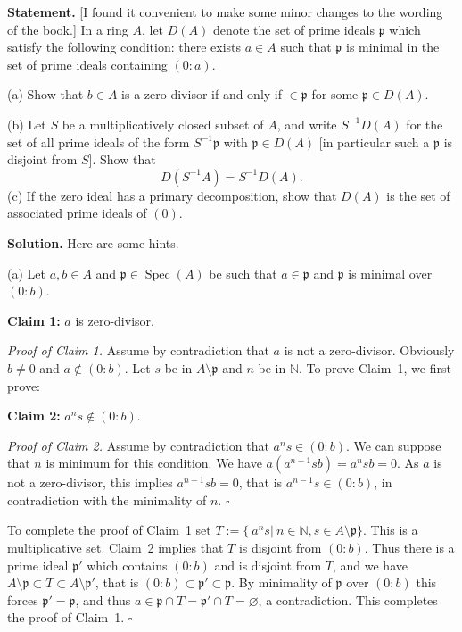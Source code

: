 \documentclass[parskip=half,fontsize=12pt]{scrartcl}%
\newcommand{\mf}{\mathfrak}
\newcommand{\ppp}{\mf p}
\newcommand{\Spec}{\operatorname{Spec}}\newcommand{\Sp}{\operatorname{Spec}}
\begin{document}
\textbf{Statement.} [I found it convenient to make some minor changes to the wording of the book.] In a ring $A$, let $D(A)$ denote the set of prime ideals $\ppp$ which satisfy the following condition: there exists $a\in A$ such that $\ppp$ is minimal in the set of prime ideals containing $(0:a)$. 

(a) Show that $b\in A$ is a zero divisor if and only if $\in\ppp$ for some $\ppp\in D(A)$.

(b) Let $S$ be a multiplicatively closed subset of $A$, and write $S^{-1}D(A)$ for the set of all prime ideals of the form $S^{-1}\ppp$ with $\ppp\in D(A)$ [in particular such a $\ppp$ is disjoint from $S$]. Show that
$$
D(S^{-1}A)=S^{-1}D(A).
$$
(c) If the zero ideal has a primary decomposition, show that $D(A)$ is the set of associated prime ideals of $(0)$.

\textbf{Solution.} Here are some hints.

(a) Let $a,b\in A$ and $\ppp\in\Spec(A)$ be such that $a\in\ppp$ and $\ppp$ is minimal over $(0:b)$.

\textbf{Claim 1:} $a$ is zero-divisor.

\emph{Proof of Claim 1.} Assume by contradiction that $a$ is not a zero-divisor. Obviously $b\ne0$ and $a\notin(0:b)$. Let $s$ be in $A\setminus\ppp$ and $n$ be in $\mathbb N$. To prove Claim~1, we first prove:

\textbf{Claim 2:} $a^ns\notin(0:b)$.

\emph{Proof of Claim 2.} Assume by contradiction that $a^ns\in(0:b)$. We can suppose that $n$ is minimum for this condition. %
We have $a(a^{n-1}sb)=a^nsb=0$. As $a$ is not a zero-divisor, this implies $a^{n-1}sb=0$, that is $a^{n-1}s\in(0:b)$, in contradiction with the minimality of $n$. $\square$

To complete the proof of Claim~1 set $T:=\{\ a^ns|\ n\in\mathbb N,s\in A\setminus\ppp\}$. This is a multiplicative set. Claim~2 implies that $T$ is disjoint from $(0:b)$. Thus there is a prime ideal $\ppp'$ which contains $(0:b)$ and is disjoint from $T$, and we have $A\setminus\ppp\subset T\subset A\setminus\ppp'$, that is $(0:b)\subset\ppp'\subset\ppp$. By minimality of $\ppp$ over $(0:b)$ this forces $\ppp'=\ppp$, and thus $a\in\ppp\cap T=\ppp'\cap T=\varnothing$, a contradiction. This completes the proof of Claim~1. $\square$ 
\end{document}
